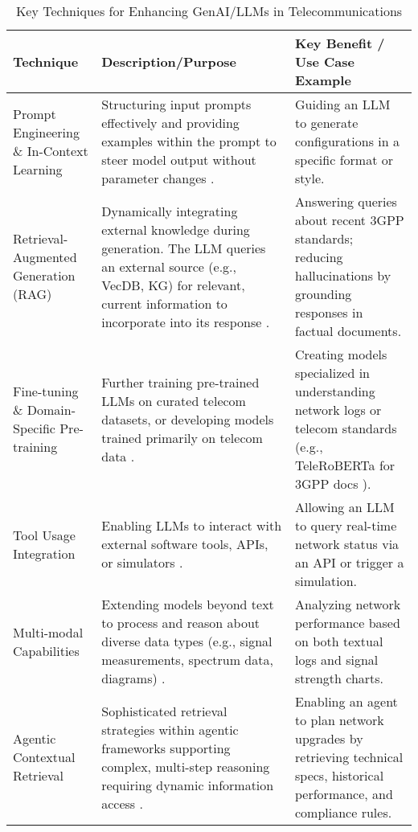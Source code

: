 \documentclass[sigconf]{acmart}
\begin{document}
\begin{table*}[htbp]
\centering
\caption{Key Techniques for Enhancing GenAI/LLMs in Telecommunications}
\label{tab:genai_enhancements}
\begin{adjustbox}{max width=\textwidth}
\begin{tabular}{@{}lp{6cm}p{5cm}@{}}
\toprule
Technique & Description/Purpose & Key Benefit / Use Case Example \\
\midrule
Prompt Engineering \& In-Context Learning & Structuring input prompts effectively and providing examples within the prompt to steer model output without parameter changes \cite{ref17, ref18}. & Guiding an LLM to generate configurations in a specific format or style. \\
Retrieval-Augmented Generation (RAG) & Dynamically integrating external knowledge during generation. The LLM queries an external source (e.g., VecDB, KG) for relevant, current information to incorporate into its response \cite{ref2, ref4, ref17, ref21, ref29}. & Answering queries about recent 3GPP standards; reducing hallucinations by grounding responses in factual documents. \\
Fine-tuning \& Domain-Specific Pre-training & Further training pre-trained LLMs on curated telecom datasets, or developing models trained primarily on telecom data \cite{ref17, ref18, ref25}. & Creating models specialized in understanding network logs or telecom standards (e.g., TeleRoBERTa for 3GPP docs \cite{ref18}). \\
Tool Usage Integration & Enabling LLMs to interact with external software tools, APIs, or simulators \cite{ref17}. & Allowing an LLM to query real-time network status via an API or trigger a simulation. \\
Multi-modal Capabilities & Extending models beyond text to process and reason about diverse data types (e.g., signal measurements, spectrum data, diagrams) \cite{ref17}. & Analyzing network performance based on both textual logs and signal strength charts. \\
Agentic Contextual Retrieval & Sophisticated retrieval strategies within agentic frameworks supporting complex, multi-step reasoning requiring dynamic information access \cite{ref35}. & Enabling an agent to plan network upgrades by retrieving technical specs, historical performance, and compliance rules. \\
\bottomrule
\end{tabular}
\end{adjustbox}
\end{table*}
\end{document}
